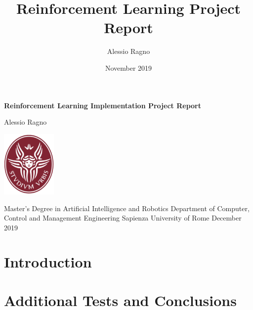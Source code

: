 \documentclass[12pt,a4paper]{article}
\author{Alessio Ragno}
\title{Reinforcement Learning Project Report}
\date{November 2019}
\begin{document}

\begin{titlepage}
    \begin{center}
        \vspace*{1cm}
        
        \huge
        \textbf{Reinforcement Learning Implementation Project Report}
        
        
        \vspace{1.5cm}
        \LARGE
        Alessio Ragno
        
        \vfill
        
        \includegraphics[width=0.2\textwidth]{sapienza_logo.png}


        
        \vfill
        
  

        \vspace{0.5cm}
        
        
        \large
        Master's Degree in Artificial Intelligence and Robotics\break\break
        Department of Computer, Control and Management Engineering\break\break
        Sapienza University of Rome\break\break
        December 2019

    \end{center}
\end{titlepage}



\pagebreak
\tableofcontents
\pagebreak

\section{Introduction}

\section{Additional Tests and Conclusions}
\end{document}

